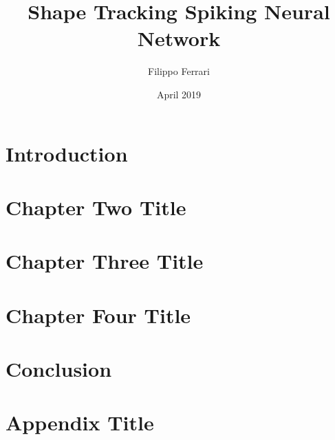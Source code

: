 \documentclass[12pt]{report}
\title{Shape Tracking Spiking Neural Network}
\author{Filippo Ferrari}
\date{April 2019}
\begin{document}






\tableofcontents

\listoffigures

\listoftables

\chapter{Introduction}


\chapter{Chapter Two Title}


\chapter{Chapter Three Title}


\chapter{Chapter Four Title}


\chapter{Conclusion}


\appendix
\chapter{Appendix Title}


%

\printbibliography
\end{document}
